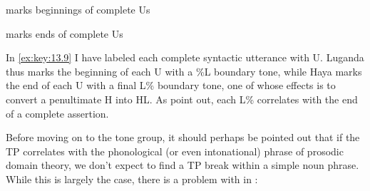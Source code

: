 \documentclass[output=paper]{langsci/langscibook}
\begin{document}
\newpage

\ea\label{ex:key:13.9}
    \ea {} marks beginnings of complete Us\\

    \ex {} marks ends of complete Us\\
    \z
\z
In \eqref{ex:key:13.9} I have labeled each complete syntactic utterance with U.
Luganda thus marks the beginning of each U with a \%L boundary tone, while Haya
marks the end of each U with a final L\% boundary tone, one of whose effects is
to convert a penultimate H into HL. As \citet{ByarushengoHymanTenenbaum1976} point out,
each L\% correlates with the end of a complete assertion.

Before moving on to the tone group, it should perhaps be pointed out that if
the TP correlates with the phonological (or even intonational)
phrase of
prosodic domain theory, we don’t expect to find a TP break
within a simple noun phrase. While this is largely the case, there is a problem
with  in :
\end{document}
